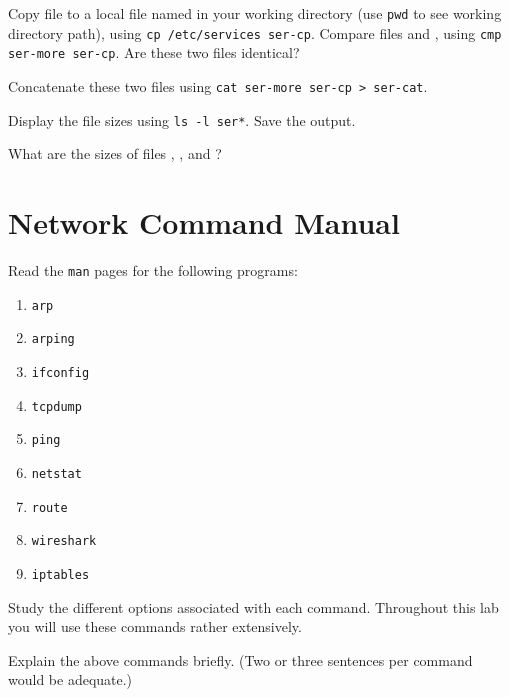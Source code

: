 \documentclass{../UTNetLab}
\begin{document}
    Copy  file to a local file named  in your working directory (use \lstinline{pwd} to see working directory path),
    using \lstinline{cp /etc/services ser-cp}.
    Compare files  and , using \lstinline{cmp ser-more ser-cp}.
    Are these two files identical?

    Concatenate these two files using \lstinline{cat ser-more ser-cp > ser-cat}.

    Display the file sizes using \lstinline{ls -l ser*}.
    Save the output.
    
    \begin{report}
        \item What are the sizes of files , , and ?
    \end{report}

\section{Network Command Manual}
    Read the \lstinline{man} pages for the following programs:
    \begin{multicols}{3}
        \begin{enumerate}
            \item \lstinline{arp}
            \item \lstinline{arping}
            \item \lstinline{ifconfig}
            \item \lstinline{tcpdump}
            \item \lstinline{ping}
            \item \lstinline{netstat}
            \item \lstinline{route}
            \item \lstinline{wireshark}
            \item \lstinline{iptables}
        \end{enumerate}
    \end{multicols}
    Study the different options associated with each command.
    Throughout this lab you will use these commands rather extensively.
    
    \begin{report}
        \item Explain the above commands briefly.
            (Two or three sentences per command would be adequate.)
    \end{report}
\end{document}
